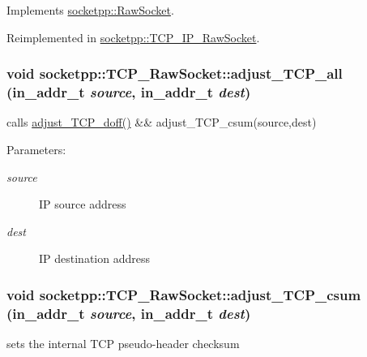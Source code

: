 Implements \hyperlink{classsocketpp_1_1RawSocket_45e6b041703cb8ae0f93dd19766865d5}{socketpp::RawSocket}.

Reimplemented in \hyperlink{classsocketpp_1_1TCP__IP__RawSocket_f8f606ce33835813cc5c3a530e181432}{socketpp::TCP\_\-IP\_\-RawSocket}.\hypertarget{classsocketpp_1_1TCP__RawSocket_0a1017145ae76253dfca51cbd672fae7}{
\subsubsection[{adjust\_\-TCP\_\-all}]{\setlength{\rightskip}{0pt plus 5cm}void socketpp::TCP\_\-RawSocket::adjust\_\-TCP\_\-all (in\_\-addr\_\-t {\em source}, \/  in\_\-addr\_\-t {\em dest})}}
\label{classsocketpp_1_1TCP__RawSocket_0a1017145ae76253dfca51cbd672fae7}


calls \hyperlink{classsocketpp_1_1TCP__RawSocket_029eb8bfbf19531253edf046775d9f5f}{adjust\_\-TCP\_\-doff()} \&\& adjust\_\-TCP\_\-csum(source,dest) 

\begin{Desc}
\item[Parameters:]
\begin{description}
\item[{\em source}]IP source address \item[{\em dest}]IP destination address \end{description}
\end{Desc}
\hypertarget{classsocketpp_1_1TCP__RawSocket_c1a2ef8b2661bb0f3ca3fa6a636b25fd}{
\subsubsection[{adjust\_\-TCP\_\-csum}]{\setlength{\rightskip}{0pt plus 5cm}void socketpp::TCP\_\-RawSocket::adjust\_\-TCP\_\-csum (in\_\-addr\_\-t {\em source}, \/  in\_\-addr\_\-t {\em dest})}}
\label{classsocketpp_1_1TCP__RawSocket_c1a2ef8b2661bb0f3ca3fa6a636b25fd}


sets the internal TCP pseudo-header checksum 

